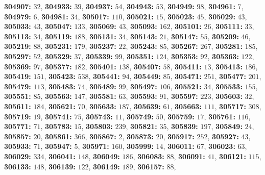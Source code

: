 \textsf{\bfseries 304907:} $32$, \textsf{\bfseries 304933:} $39$, \textsf{\bfseries 304937:} $54$, \textsf{\bfseries 304943:} $53$, \textsf{\bfseries 304949:} $98$, \textsf{\bfseries 304961:} $7$, \textsf{\bfseries 304979:} $6$, \textsf{\bfseries 304981:} $34$, \textsf{\bfseries 305017:} $110$, \textsf{\bfseries 305021:} $15$, \textsf{\bfseries 305023:} $45$, \textsf{\bfseries 305029:} $43$, \textsf{\bfseries 305033:} $43$, \textsf{\bfseries 305047:} $133$, \textsf{\bfseries 305069:} $43$, \textsf{\bfseries 305093:} $162$, \textsf{\bfseries 305101:} $26$, \textsf{\bfseries 305111:} $33$, \textsf{\bfseries 305113:} $34$, \textsf{\bfseries 305119:} $188$, \textsf{\bfseries 305131:} $34$, \textsf{\bfseries 305143:} $21$, \textsf{\bfseries 305147:} $55$, \textsf{\bfseries 305209:} $46$, \textsf{\bfseries 305219:} $88$, \textsf{\bfseries 305231:} $179$, \textsf{\bfseries 305237:} $22$, \textsf{\bfseries 305243:} $85$, \textsf{\bfseries 305267:} $267$, \textsf{\bfseries 305281:} $185$, \textsf{\bfseries 305297:} $52$, \textsf{\bfseries 305329:} $37$, \textsf{\bfseries 305339:} $99$, \textsf{\bfseries 305351:} $124$, \textsf{\bfseries 305353:} $92$, \textsf{\bfseries 305363:} $122$, \textsf{\bfseries 305369:} $97$, \textsf{\bfseries 305377:} $182$, \textsf{\bfseries 305401:} $138$, \textsf{\bfseries 305407:} $58$, \textsf{\bfseries 305411:} $13$, \textsf{\bfseries 305413:} $186$, \textsf{\bfseries 305419:} $151$, \textsf{\bfseries 305423:} $538$, \textsf{\bfseries 305441:} $94$, \textsf{\bfseries 305449:} $85$, \textsf{\bfseries 305471:} $251$, \textsf{\bfseries 305477:} $201$, \textsf{\bfseries 305479:} $113$, \textsf{\bfseries 305483:} $74$, \textsf{\bfseries 305489:} $99$, \textsf{\bfseries 305497:} $106$, \textsf{\bfseries 305521:} $34$, \textsf{\bfseries 305533:} $155$, \textsf{\bfseries 305551:} $85$, \textsf{\bfseries 305563:} $147$, \textsf{\bfseries 305581:} $63$, \textsf{\bfseries 305593:} $91$, \textsf{\bfseries 305597:} $223$, \textsf{\bfseries 305603:} $32$, \textsf{\bfseries 305611:} $184$, \textsf{\bfseries 305621:} $70$, \textsf{\bfseries 305633:} $187$, \textsf{\bfseries 305639:} $61$, \textsf{\bfseries 305663:} $111$, \textsf{\bfseries 305717:} $308$, \textsf{\bfseries 305719:} $19$, \textsf{\bfseries 305741:} $75$, \textsf{\bfseries 305743:} $11$, \textsf{\bfseries 305749:} $50$, \textsf{\bfseries 305759:} $17$, \textsf{\bfseries 305761:} $116$, \textsf{\bfseries 305771:} $71$, \textsf{\bfseries 305783:} $15$, \textsf{\bfseries 305803:} $239$, \textsf{\bfseries 305821:} $35$, \textsf{\bfseries 305839:} $197$, \textsf{\bfseries 305849:} $24$, \textsf{\bfseries 305857:} $20$, \textsf{\bfseries 305861:} $366$, \textsf{\bfseries 305867:} $2$, \textsf{\bfseries 305873:} $20$, \textsf{\bfseries 305917:} $252$, \textsf{\bfseries 305927:} $43$, \textsf{\bfseries 305933:} $71$, \textsf{\bfseries 305947:} $5$, \textsf{\bfseries 305971:} $160$, \textsf{\bfseries 305999:} $14$, \textsf{\bfseries 306011:} $67$, \textsf{\bfseries 306023:} $63$, \textsf{\bfseries 306029:} $334$, \textsf{\bfseries 306041:} $148$, \textsf{\bfseries 306049:} $186$, \textsf{\bfseries 306083:} $88$, \textsf{\bfseries 306091:} $41$, \textsf{\bfseries 306121:} $115$, \textsf{\bfseries 306133:} $148$, \textsf{\bfseries 306139:} $122$, \textsf{\bfseries 306149:} $189$, \textsf{\bfseries 306157:} $88$, 

